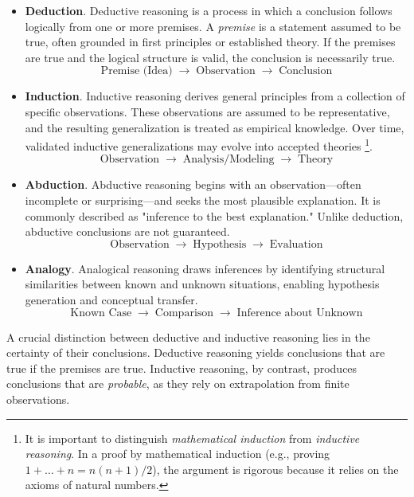 \documentclass[12pt]{article}
\begin{document}
\begin{itemize}
    \item \textbf{Deduction}. Deductive reasoning is a process in which a conclusion follows logically from one or more premises. A \textit{premise} is a statement assumed to be true, often grounded in first principles or established theory. If the premises are true and the logical structure is valid, the conclusion is necessarily true.
    \[
    \text{Premise (Idea)} \;\rightarrow\; \text{Observation} \;\rightarrow\; \text{Conclusion}
    \]

    \item \textbf{Induction}. Inductive reasoning derives general principles from a collection of specific observations. These observations are assumed to be representative, and the resulting generalization is treated as empirical knowledge. Over time, validated inductive generalizations may evolve into accepted theories \footnote{It is important to distinguish \textit{mathematical induction} from \textit{inductive reasoning}. In a proof by mathematical induction (e.g., proving $1 + \dots + n = n(n+1)/2$), the argument is rigorous because it relies on the axioms of natural numbers.}.
    \[
    \text{Observation} \;\rightarrow\; \text{Analysis/Modeling} \;\rightarrow\; \text{Theory}
    \]

    \item \textbf{Abduction}. Abductive reasoning begins with an observation—often incomplete or surprising—and seeks the most plausible explanation. It is commonly described as "inference to the best explanation." Unlike deduction, abductive conclusions are not guaranteed.
    \[
    \text{Observation} \;\rightarrow\; \text{Hypothesis} \;\rightarrow\; \text{Evaluation}
    \]

    \item \textbf{Analogy}. Analogical reasoning draws inferences by identifying structural similarities between known and unknown situations, enabling hypothesis generation and conceptual transfer.
    \[
    \text{Known Case} \;\rightarrow\; \text{Comparison} \;\rightarrow\; \text{Inference about Unknown}
    \]
\end{itemize}

A crucial distinction between deductive and inductive reasoning lies in the certainty of their conclusions. Deductive reasoning yields conclusions that are true if the premises are true. Inductive reasoning, by contrast, produces conclusions that are \textit{probable}, as they rely on extrapolation from finite observations.
\end{document}
